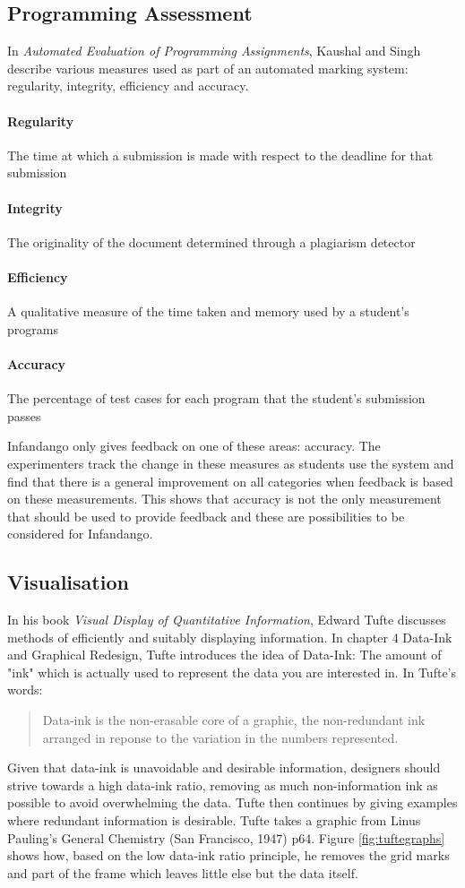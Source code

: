 \subsection{Programming Assessment}
In {\it Automated Evaluation of Programming Assignments}\cite{automate_evaluation}, Kaushal and Singh describe various measures used as part of an automated marking system: regularity, integrity, efficiency and accuracy. 
\paragraph*{Regularity} The time at which a submission is made with respect to the deadline for that submission
\paragraph*{Integrity} The originality of the document determined through a plagiarism detector
\paragraph*{Efficiency} A qualitative measure of the time taken and memory used by a student's programs
\paragraph*{Accuracy} The percentage of test cases for each program that the student's submission passes

Infandango only gives feedback on one of these areas: accuracy. The experimenters track the change in these measures as students use the system and find that there is a general improvement on all categories when feedback is based on these measurements. This shows that accuracy is not the only measurement that should be used to provide feedback and these are possibilities to be considered for Infandango.

\subsection{Visualisation}
In his book {\it Visual Display of Quantitative Information}\cite{visual_explanations}, Edward Tufte discusses methods of efficiently and suitably displaying information. In chapter 4 Data-Ink and Graphical Redesign, Tufte introduces the idea of Data-Ink: The amount of "ink" which is actually used to represent the data you are interested in. In Tufte's words:

\begin{quote}Data-ink is the non-erasable core of a graphic, the non-redundant ink arranged in reponse to the variation in the numbers represented.
\end{quote}
Given that data-ink is unavoidable and desirable information, designers should strive towards a high data-ink ratio, removing as much non-information ink as possible to avoid overwhelming the data. Tufte then continues by giving examples where redundant information is desirable.
Tufte takes a graphic from Linus Pauling's General Chemistry (San Francisco, 1947) p64. Figure \ref{fig:tuftegraphs} shows how, based on the low data-ink ratio principle, he removes the grid marks and part of the frame which leaves little else but the data itself.

